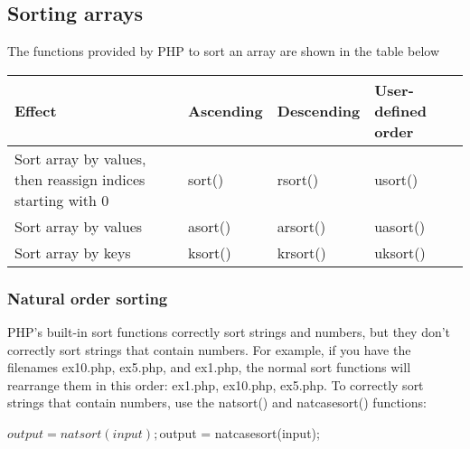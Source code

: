 \documentclass{report}
\begin{document}
\subsection{Sorting arrays}
\bigbreak \noindent 
The functions provided by PHP to sort an array are shown in the table below
\bigbreak \noindent 
\begin{center}
    \begin{tabular}{p{3cm}|p{3cm}|p{3cm}|p{3cm}}
        Effect &Ascending &Descending &User-defined order \\
        \hline
        Sort array by values, then reassign indices starting with 0 &sort() &rsort() &usort() \\
        Sort array by values &asort() &arsort() &uasort() \\
        Sort array by keys &ksort() &krsort() &uksort()
    \end{tabular}
\end{center}

\pagebreak 
\subsubsection{Natural order sorting}
\bigbreak \noindent 
PHP’s built-in sort functions correctly sort strings and numbers, but they don’t correctly sort strings that contain numbers. For example, if you have the filenames ex10.php, ex5.php, and ex1.php, the normal sort functions will rearrange them in this order: ex1.php, ex10.php, ex5.php. To correctly sort strings that contain numbers, use the natsort() and natcasesort() functions:
\bigbreak \noindent 
\begin{phpcode}
$output = natsort(input);
$output = natcasesort(input);
\end{phpcode}

\bigbreak \noindent 
\end{document}

